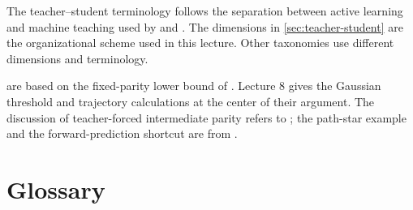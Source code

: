 \documentclass[11pt,twoside]{article}
\theoremstyle{definition}
\theoremstyle{remark}
\begin{document}
The teacher--student terminology follows the separation between active
learning and machine teaching used by \citet{zhu2015} and
\citet{liu2017}. The dimensions in \cref{sec:teacher-student} are the
organizational scheme used in this lecture. Other taxonomies use different
dimensions and terminology.

 are based on the fixed-parity
lower bound of \citet{shoshani2025}. Lecture 8 gives the Gaussian threshold and trajectory calculations at the
center of their argument. The discussion of
teacher-forced intermediate parity refers to \citet{wen2025}; the path-star
example and the forward-prediction shortcut are from \citet{hu2025}.

\section*{Glossary}
\end{document}
